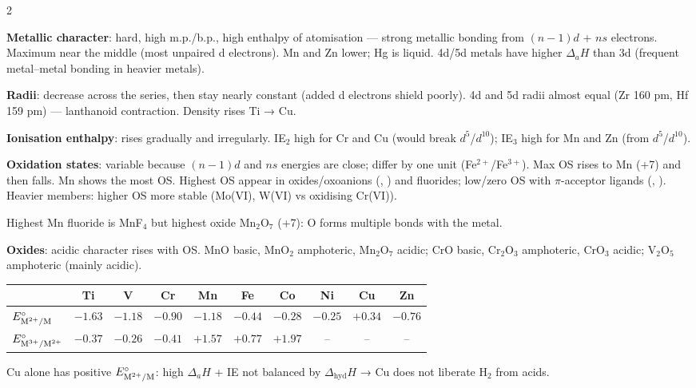 \documentclass[9pt,a4paper]{extarticle}
\begin{document}
\begin{multicols}{2}
\begin{fl}
\item \textbf{Metallic character}: hard, high m.p./b.p., high enthalpy of atomisation — strong metallic bonding from $(n-1)d$ + $ns$ electrons. Maximum near the middle (most unpaired d electrons). Mn and Zn lower; Hg is liquid. 4d/5d metals have higher $\Delta_aH$ than 3d (frequent metal--metal bonding in heavier metals).
\item \textbf{Radii}: decrease across the series, then stay nearly constant (added d electrons shield poorly). 4d and 5d radii almost equal (Zr 160 pm, Hf 159 pm) — lanthanoid contraction. Density rises Ti → Cu.
\item \textbf{Ionisation enthalpy}: rises gradually and irregularly. IE$_2$ high for Cr and Cu (would break $d^5$/$d^{10}$); IE$_3$ high for Mn and Zn (from $d^5$/$d^{10}$).
\item \textbf{Oxidation states}: variable because $(n-1)d$ and $ns$ energies are close; differ by one unit (Fe$^{2+}$/Fe$^{3+}$). Max OS rises to Mn (+7) and then falls. Mn shows the most OS. Highest OS appear in oxides/oxoanions (, ) and fluorides; low/zero OS with $\pi$-acceptor ligands (, ). Heavier members: higher OS more stable (Mo(VI), W(VI) vs oxidising Cr(VI)).
\item Highest Mn fluoride is MnF$_4$ but highest oxide Mn$_2$O$_7$ (+7): O forms multiple bonds with the metal.
\item \textbf{Oxides}: acidic character rises with OS. MnO basic, MnO$_2$ amphoteric, Mn$_2$O$_7$ acidic; CrO basic, Cr$_2$O$_3$ amphoteric, CrO$_3$ acidic; V$_2$O$_5$ amphoteric (mainly acidic).
\end{fl}
{\scriptsize\setlength{\tabcolsep}{2.4pt}
\begin{tabular}{@{}l*{9}{c}@{}}
\toprule
 & Ti & V & Cr & Mn & Fe & Co & Ni & Cu & Zn\\
\midrule
$E^\circ_{\ce{M^2+/M}}$ & $-1.63$ & $-1.18$ & $-0.90$ & $-1.18$ & $-0.44$ & $-0.28$ & $-0.25$ & $+0.34$ & $-0.76$\\
$E^\circ_{\ce{M^3+/M^2+}}$ & $-0.37$ & $-0.26$ & $-0.41$ & $+1.57$ & $+0.77$ & $+1.97$ & -- & -- & --\\
\bottomrule
\end{tabular}\par}
\begin{fl}
\item Cu alone has positive $E^\circ_{\ce{M^2+/M}}$: high $\Delta_aH$ + IE not balanced by $\Delta_\text{hyd}H$ → Cu does not liberate H$_2$ from acids.

\end{fl}
\end{multicols}
\end{document}
